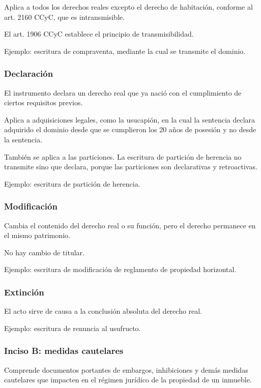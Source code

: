 \documentclass[12pt]{book}
\begin{document}
Aplica a todos los derechos reales excepto el derecho de habitaci\'on, conforme al art. 2160 CCyC, que es intransmisible.

El art. 1906 CCyC establece el principio de transmisibilidad.

Ejemplo: escritura de compraventa, mediante la cual se transmite el dominio.

\subsubsection{Declaraci\'on}

El instrumento declara un derecho real que ya naci\'o con el cumplimiento de ciertos requisitos previos.

Aplica a adquisiciones legales, como la usucapi\'on, en la cual la sentencia declara adquirido el dominio desde que se cumplieron los 20 a\~nos de posesi\'on y no desde la sentencia.

Tambi\'en se aplica a las particiones. La escritura de partici\'on de herencia no transmite sino que declara, porque las particiones son declarativas y retroactivas.

Ejemplo: escritura de partici\'on de herencia.

\subsubsection{Modificaci\'on}

Cambia el contenido del derecho real o su funci\'on, pero el derecho permanece en el mismo patrimonio.

No hay cambio de titular.

Ejemplo: escritura de modificaci\'on de reglamento de propiedad horizontal.

\subsubsection{Extinci\'on}

El acto sirve de causa a la conclusi\'on absoluta del derecho real.

Ejemplo: escritura de renuncia al usufructo.

\subsubsection{Inciso B: medidas cautelares}

Comprende documentos portantes de embargos, inhibiciones y dem\'as medidas cautelares que impacten en el r\'egimen jur\'idico de la propiedad de un inmueble.
\end{document}
